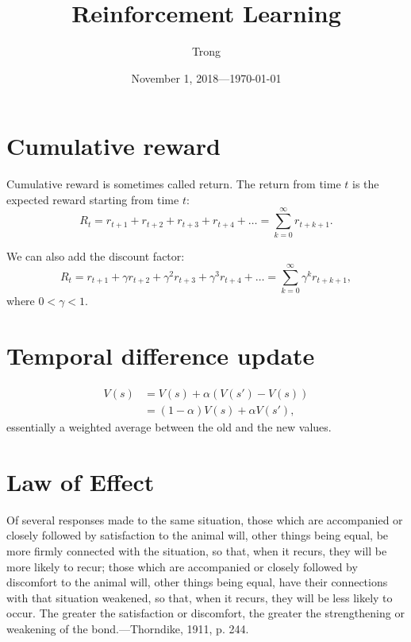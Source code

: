 \documentclass[20pt]{extarticle}
\title{Reinforcement Learning}
\author{Trong}
\date{November 1, 2018---\today}
\theoremstyle{plain}
\theoremstyle{definition}
\theoremstyle{remark}
\newcommand{\0}{\varnothing}
\newcommand{\<}{\langle}
\renewcommand{\>}{\rangle}
\begin{document}
\sloppy
\maketitle
\thispagestyle{empty}
\pagestyle{empty}

\tableofcontents

\section{Cumulative reward}


Cumulative reward is sometimes called return. The return from time \( t \) is the expected reward starting from time \( t \):
\[
R _ { t } = r _ { t + 1 } + r _ { t + 2 } + r _ { t + 3 } + r _ { t + 4 } + \ldots = \sum _ { k = 0 } ^ { \infty } r _ { t + k + 1 }.
\]

We can also add the discount factor:
\[
R _ { t } = r _ { t + 1 } + \gamma r _ { t + 2 } + \gamma ^ { 2 } r _ { t + 3 } + \gamma ^ { 3 } r _ { t + 4 } + \ldots = \sum _ { k = 0 } ^ { \infty } \gamma ^ { k } r _ { t + k + 1 },
\]
where \( 0 < \gamma < 1. \)

\section{Temporal difference update}

\begin{align*}
V(s) &= V(s) + \alpha (V(s') - V(s)) \\
   &= (1 - \alpha) V(s) + \alpha V(s'),
\end{align*}
essentially a weighted average between the old and the new values.

\section{Law of Effect}

Of several responses made to the same situation,  those which are accompanied or closely followed by satisfaction to the animal will, other things being equal, be more firmly connected with the situation, so that, when it recurs, they will be more likely to recur; those which are accompanied or closely followed by discomfort to the animal will, other things being equal, have their connections with that situation weakened, so that, when it recurs, they will be less likely to occur.  The greater the satisfaction or discomfort, the greater the strengthening or weakening of the bond.---Thorndike, 1911, p. 244.
\end{document}
